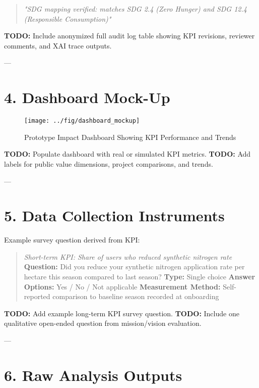 \begin{quote}
\textit{"SDG mapping verified: matches SDG 2.4 (Zero Hunger) and SDG 12.4 (Responsible Consumption)"} 
\end{quote}

\textbf{TODO:} Include anonymized full audit log table showing KPI revisions, reviewer comments, and XAI trace outputs.

---

\section*{4. Dashboard Mock-Up}

\begin{figure}[H]
    \centering
    \texttt{[image: ../fig/dashboard\_mockup]}
    \caption{Prototype Impact Dashboard Showing KPI Performance and Trends}
    \label{fig:dashboard-mockup}
\end{figure}

\textbf{TODO:} Populate dashboard with real or simulated KPI metrics.  
\textbf{TODO:} Add labels for public value dimensions, project comparisons, and trends.

---

\section*{5. Data Collection Instruments}

Example survey question derived from KPI:

\begin{quote}
\emph{Short-term KPI: Share of users who reduced synthetic nitrogen rate}  
\textbf{Question:} Did you reduce your synthetic nitrogen application rate per hectare this season compared to last season?  
\textbf{Type:} Single choice  
\textbf{Answer Options:} Yes / No / Not applicable  
\textbf{Measurement Method:} Self-reported comparison to baseline season recorded at onboarding
\end{quote}

\textbf{TODO:} Add example long-term KPI survey question.  
\textbf{TODO:} Include one qualitative open-ended question from mission/vision evaluation.

---

\section*{6. Raw Analysis Outputs}

